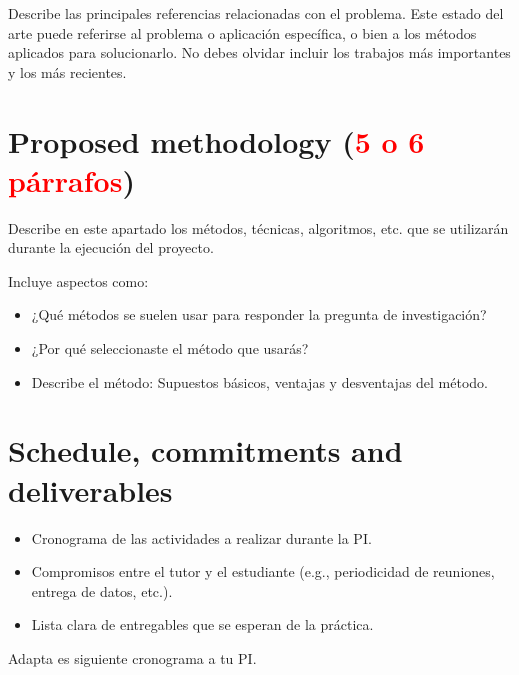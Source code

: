 \documentclass[12pt,letterpaper]{article}
\begin{document}
Describe las principales referencias relacionadas con el problema. Este estado
del arte puede referirse al problema o aplicación específica, o bien a los
métodos aplicados para solucionarlo. No debes olvidar incluir los trabajos más
importantes y los más recientes.

\section{Proposed methodology (\textcolor{red}{5 o 6 párrafos})}

Describe en este apartado los métodos, técnicas, algoritmos, etc. que se
utilizarán durante la ejecución del proyecto.

Incluye aspectos como:

\begin{itemize}
\item ¿Qué métodos se suelen usar para responder la pregunta de investigación?
\item ¿Por qué seleccionaste el método que usarás?
\item Describe el método: Supuestos básicos, ventajas y desventajas del método.
\end{itemize}


\section{Schedule, commitments and deliverables}

\begin{itemize}
\item Cronograma de las actividades a realizar durante la PI.
\item Compromisos entre el tutor y el estudiante (e.g., periodicidad de
    reuniones, entrega de datos, etc.).
\item Lista clara de entregables que se esperan de la práctica.
\end{itemize}

Adapta es siguiente cronograma a tu PI.
\end{document}
